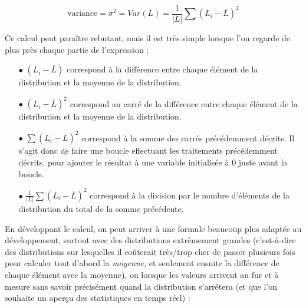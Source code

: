 \documentclass[11pt,a4paper]{article}
\begin{document}
\begin{center}
\begin{equation*}
\text{variance} = \sigma^{2} = Var(L) = \frac{1}{|L|} \sum (L_{i} - \bar{L})^{2}
\end{equation*}
\end{center}

\bigskip

Ce calcul peut paraître rebutant, mais il est très simple lorsque l'on regarde de plus près chaque partie de l'expression :

\medskip

\begin{itemize}
\item[$\bullet$] $ (L_{i} - \bar{L}) $ correspond à la différence entre chaque élément de la distribution et la moyenne de la distribution.

\item[$\bullet$] $ (L_{i} - \bar{L})^{2} $ correspond au carré de la différence entre chaque élément de la distribution et la moyenne de la distribution.

\item[$\bullet$] $ \sum (L_{i} - \bar{L})^{2} $ correspond à la somme des carrés précédemment décrits. Il s'agit donc de faire une boucle effectuant les traitements précédemment décrits, pour ajouter le résultat à une variable initialisée à $ 0 $ juste avant la boucle.

\item[$\bullet$] $ \frac{1}{|L|} \sum (L_{i} - \bar{L})^{2} $ correspond à la division par le nombre d'éléments de la distribution du total de la somme précédente.
\end{itemize}


\bigskip

En développant le calcul, on peut arriver à une formule beaucoup plus adaptée au développement, surtout avec des distributions extrêmement grandes (c'est-à-dire des distributions sur lesquelles il coûterait très/trop cher de passer plusieurs fois pour calculer tout d'abord la \textit{moyenne}, et seulement ensuite la différence de chaque élément avec la moyenne), ou lorsque les valeurs arrivent au fur et à mesure sans savoir précisément quand la distribution s'arrêtera (et que l'on souhaite un aperçu des statistiques en temps réel) :
\end{document}
